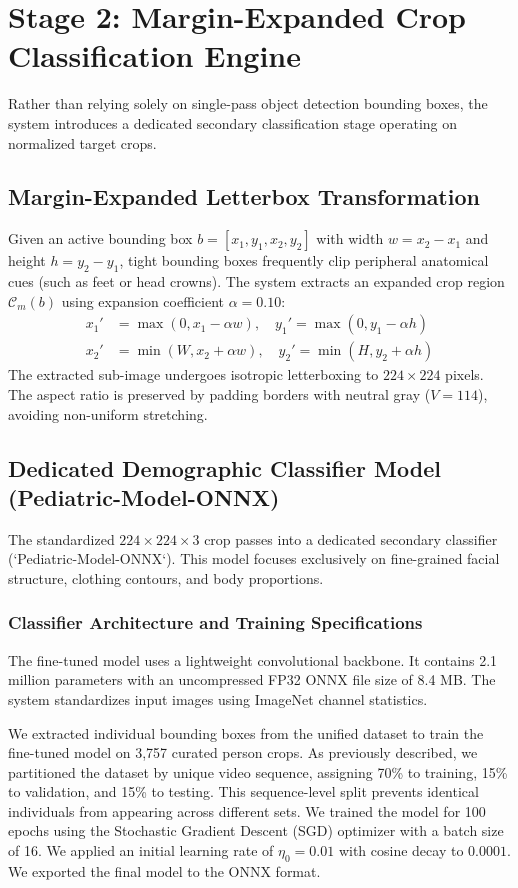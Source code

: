 \section{Stage 2: Margin-Expanded Crop Classification Engine}
Rather than relying solely on single-pass object detection bounding boxes, the system introduces a dedicated secondary classification stage operating on normalized target crops.

\subsection{Margin-Expanded Letterbox Transformation}
Given an active bounding box $b = [x_1, y_1, x_2, y_2]$ with width $w = x_2 - x_1$ and height $h = y_2 - y_1$, tight bounding boxes frequently clip peripheral anatomical cues (such as feet or head crowns). The system extracts an expanded crop region $\mathcal{C}_m(b)$ using expansion coefficient $\alpha = 0.10$:
\begin{align}
    x_1' &= \max(0, x_1 - \alpha w), \quad y_1' = \max(0, y_1 - \alpha h) \\
    x_2' &= \min(W, x_2 + \alpha w), \quad y_2' = \min(H, y_2 + \alpha h)
\end{align}
The extracted sub-image undergoes isotropic letterboxing to $224 \times 224$ pixels. The aspect ratio is preserved by padding borders with neutral gray ($V = 114$), avoiding non-uniform stretching.

\subsection{Dedicated Demographic Classifier Model (Pediatric-Model-ONNX)}
The standardized $224 \times 224 \times 3$ crop passes into a dedicated secondary classifier (`Pediatric-Model-ONNX`). This model focuses exclusively on fine-grained facial structure, clothing contours, and body proportions.

\subsubsection{Classifier Architecture and Training Specifications}
The fine-tuned model uses a lightweight convolutional backbone. It contains 2.1 million parameters with an uncompressed FP32 ONNX file size of 8.4 MB. The system standardizes input images using ImageNet channel statistics.

We extracted individual bounding boxes from the unified dataset to train the fine-tuned model on 3,757 curated person crops. As previously described, we partitioned the dataset by unique video sequence, assigning 70\% to training, 15\% to validation, and 15\% to testing. This sequence-level split prevents identical individuals from appearing across different sets. We trained the model for 100 epochs using the Stochastic Gradient Descent (SGD) optimizer with a batch size of 16. We applied an initial learning rate of $\eta_0 = 0.01$ with cosine decay to $0.0001$. We exported the final model to the ONNX format.

